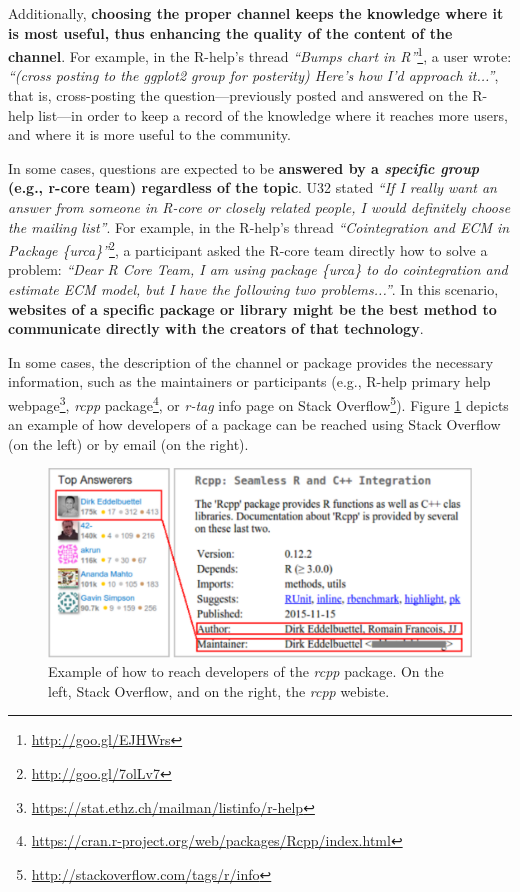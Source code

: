     Additionally, \textbf{choosing the proper channel keeps the knowledge where it is most useful, thus enhancing the quality of the content of the channel}.
    For example, in the R-help's thread \textit{``Bumps chart in R''}\footnote{\url{http://goo.gl/EJHWrs}}, a user wrote: \textit{``(cross posting to the ggplot2 group for posterity) Here's how I'd approach it...''}, that is, cross-posting the question---previously posted and answered on the R-help list---in order to keep a record of the knowledge where it reaches more users, and where it is more useful to the community.

    In some cases, questions are expected to be \textbf{answered by a \textit{specific group} (e.g., r-core team) regardless of the topic}.
    U32 stated \textit{``If I really want an answer from someone in R-core or closely related people, I would definitely choose the mailing list''}.
    For example, in the R-help's thread \textit{``Cointegration and ECM in Package \{urca\}''}\footnote{\url{http://goo.gl/7olLv7}}, a participant asked the R-core team directly how to solve a problem: \textit{``Dear R Core Team, I am using package \{urca\} to do cointegration and estimate ECM model, but I have the following two problems...''}.
    In this scenario, \textbf{websites of a specific package or library might be the best method to communicate directly with the creators of that technology}.
     

In some cases, the description of the channel or package provides the necessary information, such as the maintainers or participants (e.g., R-help primary help webpage\footnote{\url{https://stat.ethz.ch/mailman/listinfo/r-help}}, \emph{rcpp} package\footnote{\url{https://cran.r-project.org/web/packages/Rcpp/index.html}}, or \textit{r-tag} info page on Stack Overflow\footnote{\url{http://stackoverflow.com/tags/r/info}}).
    Figure \ref{fig:CCchannel} depicts an example of how developers of a package can be reached using Stack Overflow (on the left) or by email (on the right). 

    \begin{figure} [!htb]
        \centering
        \includegraphics[width=\columnwidth]{Figures/CCchannel}
        \caption{Example of how to reach developers of the \emph{rcpp} package. On the left, Stack Overflow, and on the right, the \emph{rcpp} webiste.}
        \label{fig:CCchannel}
    \end{figure}

